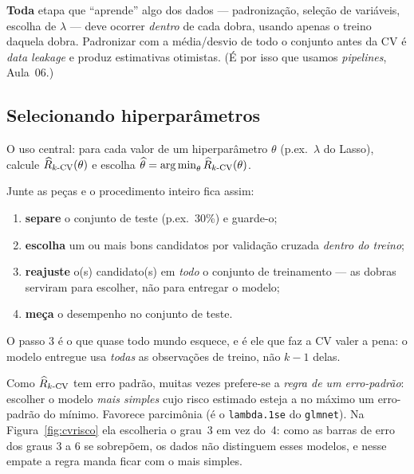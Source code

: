 \documentclass[11pt,a4paper]{article}
\begin{document}
\begin{atencao}
\textbf{Toda} etapa que ``aprende'' algo dos dados --- padronização, seleção de
variáveis, escolha de $\lambda$ --- deve ocorrer \emph{dentro} de cada dobra,
usando apenas o treino daquela dobra. Padronizar com a média/desvio de todo o
conjunto antes da CV é \emph{data leakage} e produz estimativas otimistas. (É por
isso que usamos \emph{pipelines}, Aula~06.)
\end{atencao}

\subsection{Selecionando hiperparâmetros}
O uso central: para cada valor de um hiperparâmetro $\theta$ (p.ex.\ $\lambda$ do
Lasso), calcule $\widehat{R}_{k\text{-CV}}(\theta)$ e escolha
$\widehat\theta=\argmin_\theta \riscohat_{k\text{-CV}}(\theta)$.

\begin{ideia}
Junte as peças e o procedimento inteiro fica assim:
\begin{enumerate}[leftmargin=1.6cm,nosep]
  \item \textbf{separe} o conjunto de teste (p.ex.\ 30\%) e guarde-o;
  \item \textbf{escolha} um ou mais bons candidatos por validação cruzada
        \emph{dentro do treino};
  \item \textbf{reajuste} o(s) candidato(s) em \emph{todo} o conjunto de
        treinamento --- as dobras serviram para escolher, não para entregar o
        modelo;
  \item \textbf{meça} o desempenho no conjunto de teste.
\end{enumerate}
O passo 3 é o que quase todo mundo esquece, e é ele que faz a CV valer a pena: o
modelo entregue usa \emph{todas} as observações de treino, não $k-1$ delas.
\end{ideia}

\begin{atencao}[Regra ``1-EP'']
Como $\widehat{R}_{k\text{-CV}}$ tem erro padrão, muitas vezes prefere-se a
\emph{regra de um erro-padrão}: escolher o modelo \emph{mais simples} cujo risco
estimado esteja a no máximo um erro-padrão do mínimo. Favorece parcimônia
(é o \texttt{lambda.1se} do \texttt{glmnet}). Na Figura~\ref{fig:cvrisco} ela
escolheria o grau~3 em vez do~4: como as barras de erro dos graus 3 a 6 se
sobrepõem, os dados não distinguem esses modelos, e nesse empate a regra manda ficar
com o mais simples.
\end{atencao}
\end{document}
